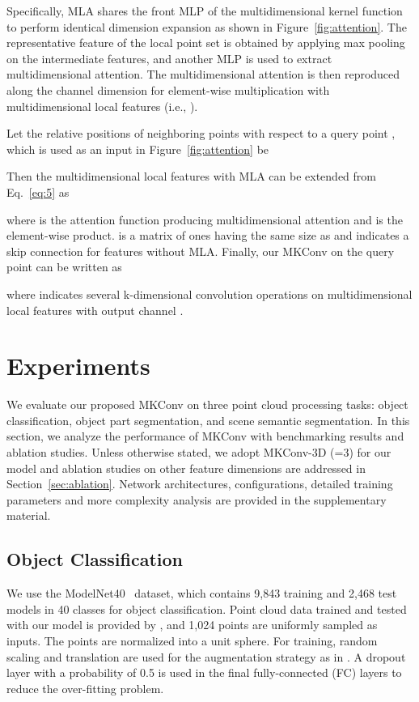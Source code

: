 \documentclass[preprint,12pt]{elsarticle}
\begin{document}
Specifically, MLA shares the front MLP of the multidimensional kernel function to perform identical dimension expansion as shown in Figure~\ref{fig:attention}. The representative feature of the local point set is obtained by applying max pooling on the intermediate features, and another MLP is used to extract multidimensional attention. The multidimensional attention is then reproduced along the channel dimension for element-wise multiplication with multidimensional local features (i.e., ). 

Let the relative positions  of neighboring points with respect to a query point , which is used as an input in Figure~\ref{fig:attention} be 

Then the multidimensional local features  with MLA can be extended from Eq.~\ref{eq:5} as

where  is the attention function producing multidimensional attention and  is the element-wise product.  is a matrix of ones having the same size as  and indicates a skip connection for features without MLA. Finally, our MKConv on the query point  can be written as

where  indicates several k-dimensional convolution operations on multidimensional local features with output channel .




\section{Experiments}
\label{exp}

We evaluate our proposed MKConv on three point cloud processing tasks: object classification, object part segmentation, and scene semantic segmentation. In this section, we analyze the performance of MKConv with benchmarking results and ablation studies. Unless otherwise stated, we adopt MKConv-3D (=3) for our model and ablation studies on other feature dimensions  are addressed in Section~\ref{sec:ablation}. Network architectures, configurations, detailed training parameters and more complexity analysis are provided in the supplementary material.


\subsection{Object Classification}
\label{sec:cls}

We use the ModelNet40~\citep{wu20153d} dataset, which contains 9,843 training and 2,468 test models in 40 classes for object classification. Point cloud data trained and tested with our model is provided by \cite{qi2017pointnet}, and 1,024 points are uniformly sampled as inputs. The points are normalized into a unit sphere. For training, random scaling and translation are used for the augmentation strategy as in \cite{klokov2017escape, liu2019relation}. A dropout layer with a probability of 0.5 is used in the final fully-connected (FC) layers to reduce the over-fitting problem.
\end{document}
